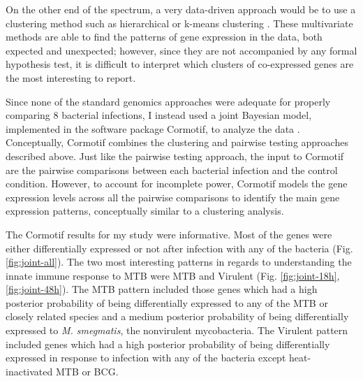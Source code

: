 On the other end of the spectrum, a very data-driven approach would be to use a
clustering method such as hierarchical or k-means clustering \citep{Eisen1998, Michaels1998}. These multivariate
methods are able to find the patterns of gene expression in the data, both
expected and unexpected; however, since they are not accompanied by any formal
hypothesis test, it is difficult to interpret which clusters of co-expressed
genes are the most interesting to report.

Since none of the standard genomics approaches were adequate for properly
comparing 8 bacterial infections, I instead used a joint Bayesian model,
implemented in the software package Cormotif, to analyze the data \citep{Wei2015}. Conceptually,
Cormotif combines the clustering and pairwise testing approaches described
above. Just like the pairwise testing approach, the input to Cormotif are the
pairwise comparisons between each bacterial infection and the control
condition. However, to account for incomplete power, Cormotif models the gene
expression levels across all the pairwise comparisons to identify the main gene
expression patterns, conceptually similar to a clustering analysis.

The Cormotif results for my study were informative. Most of the genes were
either differentially expressed or not after infection with any of the
bacteria (Fig. \ref{fig:joint-all}). The two most interesting patterns in regards to understanding the
innate immune response to MTB were MTB and Virulent (Fig. \ref{fig:joint-18h},\ref{fig:joint-48h}).  The MTB pattern included
those genes which had a high posterior probability of being differentially
expressed to any of the MTB or closely related species and a medium posterior
probability of being differentially expressed to \emph{M. smegmatis}, the
nonvirulent mycobacteria. The Virulent pattern included genes which had a high
posterior probability of being differentially expressed in response to infection
with any of the bacteria except heat-inactivated MTB or BCG.

